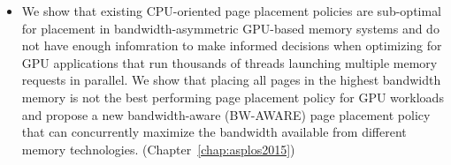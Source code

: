 \begin{itemize}
\item
We show that existing CPU-oriented page placement policies are 
sub-optimal for placement in bandwidth-asymmetric GPU-based memory systems and do not have enough
infomration to make informed decisions when optimizing for GPU applications that run thousands of
threads launching multiple memory requests in parallel.
We show that placing all pages in the highest bandwidth memory is not the best
performing page placement policy for GPU workloads and propose a new
bandwidth-aware (BW-AWARE) page placement policy that can concurrently maximize
the bandwidth available from different memory technologies.
(Chapter~\ref{chap:asplos2015})





\end{itemize}
